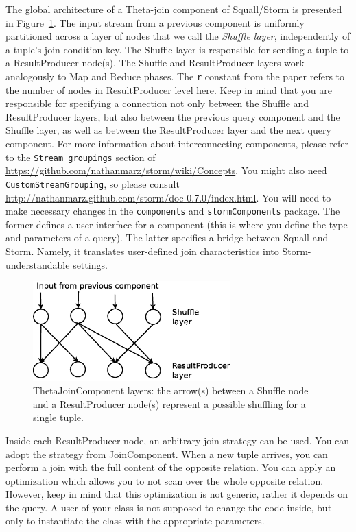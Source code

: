 \documentclass[a4paper,10pt]{article}
\begin{document}
The global architecture of a Theta-join component of Squall/Storm is presented in Figure~\ref{fig:ThetaJoinComponent}. The input stream from a previous component is uniformly partitioned across a layer of nodes that we call the \textit{Shuffle layer}, independently of a tuple's join condition key. The Shuffle layer is responsible for sending a tuple to a ResultProducer node(s). The Shuffle and ResultProducer layers work analogously to Map and Reduce phases. The \verb#r# constant from the paper refers to the number of nodes in ResultProducer level here. Keep in mind that you are responsible for specifying a connection not only between the Shuffle and ResultProducer layers, but also between the previous query component and the Shuffle layer, as well as between the ResultProducer layer and the next query component. For more information about interconnecting components, please refer to the \verb#Stream groupings# section of \url{https://github.com/nathanmarz/storm/wiki/Concepts}. You might also need \verb#CustomStreamGrouping#, so please consult \url{http://nathanmarz.github.com/storm/doc-0.7.0/index.html}. You will need to make necessary changes in the \verb#components# and \verb#stormComponents# package. The former defines a user interface for a component (this is where you define the type and parameters of a query). The latter specifies a bridge between Squall and Storm. Namely, it translates user-defined join characteristics into Storm-understandable settings.

\begin{figure}
\centering
\includegraphics[width=3in]{ThetaJoinComponent.eps}
\vspace{-3mm}
\caption{ThetaJoinComponent layers: the arrow(s) between a Shuffle node and a ResultProducer node(s) represent a possible shuffling for a single tuple.}
\label{fig:ThetaJoinComponent}
\vspace{-2mm}
\end{figure}

Inside each ResultProducer node, an arbitrary join strategy can be used. You can adopt the strategy from JoinComponent. When a new tuple arrives, you can perform a join with the full content of the opposite relation. You can apply an optimization which allows you to not scan over the whole opposite relation. However, keep in mind that this optimization is not generic, rather it depends on the query. A user of your class is not supposed to change the code inside, but only to instantiate the class with the appropriate parameters.
\end{document}
